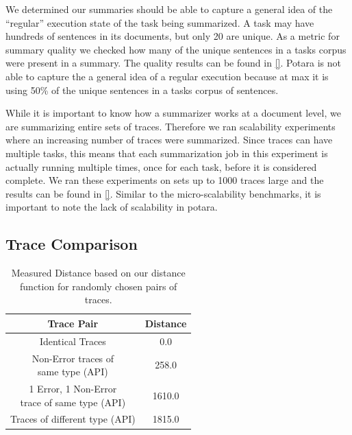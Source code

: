  We determined our summaries should be able to capture a general idea of the ``regular'' execution state of the task being summarized. 
A task may have hundreds of sentences in its documents, but only 20 are unique. As a metric for summary quality
we checked how many of the unique sentences in a tasks corpus were present in a summary. The quality results can be found in \autoref{}. Potara is not able to capture 
the a general idea of a regular execution because at max it is using 50\% of the unique sentences in a tasks corpus of sentences. 

 While it is important to know how a summarizer works at a document level, we are summarizing entire sets of traces. Therefore
we ran scalability experiments where an increasing number of traces were summarized. Since traces can have multiple tasks, this means that each summarization job 
in this experiment is actually running multiple times, once for each task, before it is considered complete. We ran these experiments on sets up to 1000 traces large and the 
results can be found in \autoref{}. Similar to the micro-scalability benchmarks, it is important to note the lack of scalability in potara. 

\subsection{Trace Comparison}

\begin{table}[]
    \begin{tabular}{|c|c|}
    \hline
    Trace Pair                              & Distance \\
    \hline
    \hline
    Identical Traces                        & 0.0      \\
    \hline
    \makecell{Non-Error traces of \\ same type (API)}     & 258.0    \\
    \hline
    \makecell{1 Error, 1 Non-Error \\ trace of same type (API)} & 1610.0  \\
    \hline
    Traces of different type (API)          & 1815.0   \\
    \hline
    \end{tabular}
    \caption{Measured Distance based on our distance function for randomly chosen pairs of traces.}
    \label{tab:comparison_dist}
\end{table}

